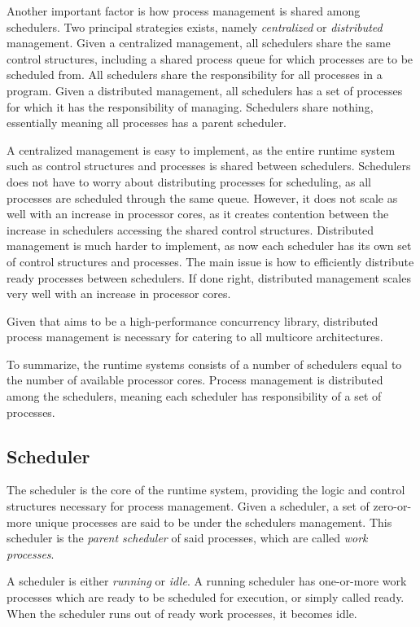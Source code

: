 Another important factor is how process management is shared among schedulers. Two principal strategies exists, namely \textit{centralized} or \textit{distributed} management. Given a centralized management, all schedulers share the same control structures, including a shared process queue for which processes are to be scheduled from. All schedulers share the responsibility for all processes in a program. Given a distributed management, all schedulers has a set of processes for which it has the responsibility of managing. Schedulers share nothing, essentially meaning all processes has a parent scheduler.

A centralized management is easy to implement, as the entire runtime system such as control structures and processes  is shared between schedulers. Schedulers does not have to worry about distributing processes for scheduling, as all processes are scheduled through the same queue. However, it does not scale as well with an increase in processor cores, as it creates contention between the increase in schedulers accessing the shared control structures. Distributed management is much harder to implement, as now each scheduler has its own set of control structures and processes. The main issue is how to efficiently distribute ready processes between schedulers. If done right, distributed management scales very well with an increase in processor cores.

Given that \Proxc{} aims to be a high\hyp{}performance concurrency library, distributed process management is necessary for catering to all multicore architectures.

To summarize, the runtime systems consists of a number of schedulers equal to the number of available processor cores. Process management is distributed among the schedulers, meaning each scheduler has responsibility of a set of processes.


\subsection{Scheduler}


The scheduler is the core of the runtime system, providing the logic and control structures necessary for process management. Given a scheduler, a set of zero\hyp{}or\hyp{}more unique processes are said to be under the schedulers management. This scheduler is the \textit{parent scheduler} of said processes, which are called \textit{work processes}.

A scheduler is either \textit{running} or \textit{idle}. A running scheduler has one\hyp{}or\hyp{}more work processes which are ready to be scheduled for execution, or simply called ready. When the scheduler runs out of ready work processes, it becomes idle.

